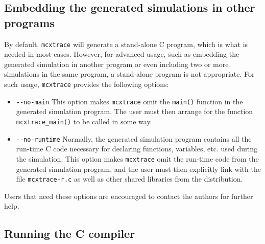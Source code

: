 \subsection{Embedding the generated simulations in other programs}

By default, \texttt{mcxtrace} will generate a stand-alone C program, which is what is needed
in most cases. However, for advanced usage, such as embedding the generated
simulation in another program or even including two or more simulations in the
same program, a stand-alone program is not appropriate.
For such usage, \texttt{mcxtrace} provides the following options:
\begin{itemize}
\item \verb+--no-main+ This option makes \texttt{mcxtrace} omit the \verb+main()+ function
  in the generated simulation program. The user must then arrange for the
  function \verb+mcxtrace_main()+ to be called in some way.
\item \verb+--no-runtime+ Normally, the
  generated simulation program contains all the run-time C code necessary for
  declaring functions, variables, etc. used during the simulation.  This
  option makes \texttt{mcxtrace} omit the run-time code from the generated
  simulation program, and the user must then explicitly link with the file
  \verb+mcxtrace-r.c+ as well as other shared libraries
  from the \MCX distribution.
\end{itemize}
Users that need these options are encouraged to contact the authors for further
help.


\subsection{Running the C compiler}
\label{s:compile}

